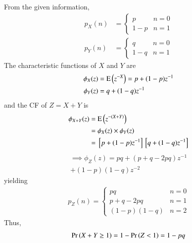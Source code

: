 From the given information, 
\begin{align}
    p_{X}(n) &= 
\begin{cases}
p & n=0
\\
1-p & n=1
\end{cases}\label{sum/1/1}
\\
p_{Y}(n) &= 
\begin{cases}
q & n=0
\\
1-q & n=1
\end{cases}\label{sum/1/2}
\end{align}
%
  The characteristic functions of $X$ and $Y$ are 
%
\begin{align}
\phi_X(z)&=\text{E}\left( z^{-X} \right) =  p+(1-p)z^{-1}
\\
\phi_Y(z)&= q+(1-q)z^{-1}
\end{align}
and the CF of $  Z=X+Y$ is 
\begin{align}
\phi_{X+Y}(z)&=\text{E}\left( z^{-(X+Y)} \right) \\
               &=\phi_X(z)\times \phi_Y(z)
               \\
  & ={}\left[p+(1-p)z^{-1}\right]{}\left[q+(1-q)z^{-1}\right]
  \end{align}
  \begin{multline}
\implies \phi_{Z}(z) = pq+(p+q-2pq)z^{-1}\\
  +(1-p)(1-q)z^{-2}
\end{multline}
yielding 
\begin{align}
    p_{Z}(n) = 
\begin{cases}
pq & n=0
\\
p+q-2pq & n=1\\
(1-p)(1-q) & n=2
\end{cases}\label{sum/1/3}
\end{align}
Thus, 
\begin{align}
    \Pr\left(X+Y\geq1\right) = 1 - \Pr\left(Z<1\right)= 1-pq   
\end{align}